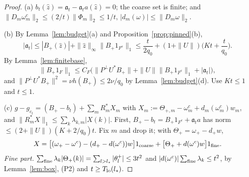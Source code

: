 \documentclass[10pt]{amsart}
\theoremstyle{definition}
\theoremstyle{remark}
\newcommand{\zh}{\hat z}
\begin{document}
\begin{proof}
(a) $b_t(\zh)=\mathfrak a_t-\mathfrak a_ta(\zh)=0$; the coarse set is finite; and
$\|D_m\omega^c_m\|_2\le(2/t)\|\Phi_m\|_2\le1/t$, $|d_m(\omega)|\le
\|D_m\omega\|_2$.

(b) By Lemma~\ref{lem:budget}(a) and Proposition~\ref{prop:pinned}(b),
\[
 |\mathfrak a_t|\le|B_+(\zh)|+\|\zh\|_\infty\|B_+1_{F^c}\|_1\le\frac t{2q_0}+
 (1+\|U\|)\Big(Kt+\frac t{q_0}\Big).
\]
By Lemma~\ref{lem:finitebase},
\[
 \|B_+1_F\|_1\le C_F\big(\|P^\perp U^*B_+\|+\|U\|\|B_+1_{F^c}\|_1+
 |\mathfrak a_t|\big),
\]
and $\|P^\perp U^*B_+\|^2=\nu h(B_+)\le2\nu/q_0$ by
Lemma~\ref{lem:budget}(d).  Use $Kt\le1$ and $t\le1$.

(c) $g-g_{c_t}=(B_+-b_t)+\sum_mR_m^*X_m$ with $X_m:=\Theta_{+,m}-\omega^c_m+
d_m(\omega^c_m)w_m$, and $\|R^*_mX\|_1\le\sum_k\lambda_{k,m}|X(k)|$.  First,
$B_+-b_t=B_+1_{F^c}+\mathfrak a_ta$ has norm $\le(2+\|U\|)(K+2/q_0)t$.  Fix $m$
and drop it; with $\Theta_+=\omega_+-d_+w$,
\[
 X=\big[(\omega_+-\omega^c)-(d_+-d(\omega^c))w\big]1_{\rm coarse}+
 \big[\Theta_++d(\omega^c)w\big]1_{\rm fine}.
\]
\emph{Fine part.}  $\sum_{\rm fine}\lambda_k|\Theta_+(k)|=\sum_{l>l_*}
|\theta^+_l|\le3t^2$ and $|d(\omega^c)|\sum_{\rm fine}\lambda_k\le t^2$, by
Lemma~\ref{lem:box}, (P2) and $t\ge T_{\rm lo}(l_*)$.


\end{proof}
\end{document}
